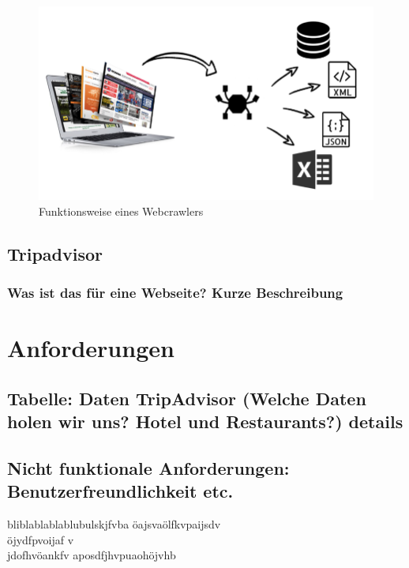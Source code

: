 \documentclass[a4paper,oneside,12pt]{report}
\begin{document}
				\begin{figure}[H]
					\centering
					\begin{minipage}[b]{0.9\textwidth}
						\includegraphics[width=\textwidth]{Bilder/Webcrawler.png}
					\end{minipage}
					\centering
					\caption[Funktionsweise eines Webcrawlers]{Funktionsweise eines Webcrawlers}
					\label{pic-webcrawler}
				\end{figure}
	
		\section{Tripadvisor}
	
			\subsection{Was ist das für eine Webseite? Kurze Beschreibung}
	
	
	
	
	\chapter{Anforderungen}	
	
		\section{Tabelle: Daten TripAdvisor (Welche Daten holen wir uns? Hotel und Restaurants?) details}
	
		\section{Nicht funktionale Anforderungen: Benutzerfreundlichkeit etc.}
	
		bliblablablablubulskjfvba
		öajsvaölfkvpaijsdv
		\\
		öjydfpvoijaf
		v\\jdofhvöankfv
		aposdfjhvpuaohöjvhb
	
\end{document}
